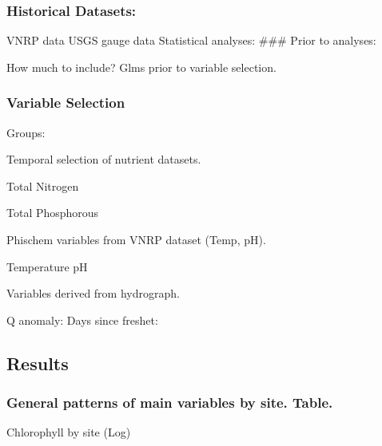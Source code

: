 \documentclass[
]{article}
\begin{document}
\hypertarget{historical-datasets}{%
\subsubsection{Historical Datasets:}\label{historical-datasets}}

VNRP data USGS gauge data Statistical analyses: \#\#\# Prior to
analyses:

How much to include? Glms prior to variable selection.

\hypertarget{variable-selection}{%
\subsubsection{Variable Selection}\label{variable-selection}}

Groups:

Temporal selection of nutrient datasets.

Total Nitrogen

Total Phosphorous

Phischem variables from VNRP dataset (Temp, pH).

Temperature pH

Variables derived from hydrograph.

Q anomaly: Days since freshet:

\hypertarget{results}{%
\subsection{Results}\label{results}}

\hypertarget{general-patterns-of-main-variables-by-site.-table.}{%
\subsubsection{General patterns of main variables by site.
Table.}\label{general-patterns-of-main-variables-by-site.-table.}}

Chlorophyll by site (Log)
\end{document}

